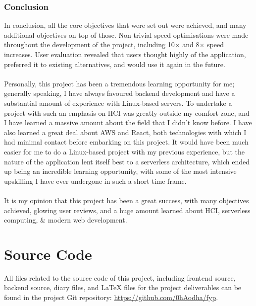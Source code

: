 \documentclass[a4paper,11pt]{report}
\begin{document}
\subsection{Conclusion}
In conclusion, all the core objectives that were set out were achieved, and many additional objectives on top of those.
Non-trivial speed optimisations were made throughout the development of the project, including 10$\times$ and 8$\times$ speed increases.
User evaluation revealed that users thought highly of the application, preferred it to existing alternatives, and would use it again in the future.
\\\\
Personally, this project has been a tremendous learning opportunity for me;
generally speaking, I have always favoured backend development and have a substantial amount of experience with Linux-based servers.
To undertake a project with such an emphasis on HCI was greatly outside my comfort zone, and I have learned a massive amount about the field that I didn't know before.
I have also learned a great deal about AWS and React, both technologies with which I had minimal contact before embarking on this project.
It would have been much easier for me to do a Linux-based project with my previous experience, but the nature of the application lent itself best to a serverless architecture, which ended up being an incredible learning opportunity, with some of the most intensive upskilling I have ever undergone in such a short time frame.
\\\\
It is my opinion that this project has been a great success, with many objectives achieved, glowing user reviews, and a huge amount learned about HCI, serverless computing, \& modern web development.







\appendix
\chapter{Source Code}
All files related to the source code of this project, including frontend source, backend source, diary files, and {\LaTeX} files for the project deliverables can be found in the project Git repository: \url{https://github.com/0hAodha/fyp}.

\printbibliography
\end{document}

